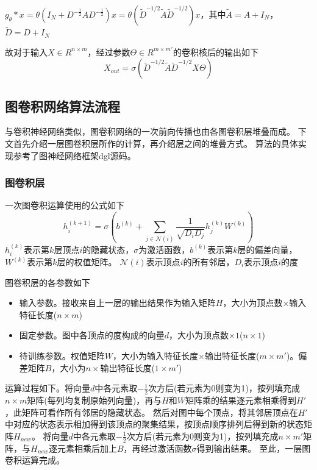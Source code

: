 $g_\theta*x=\theta(I_N+D^{-\frac{1}{2}}AD^{-\frac{1}{2}})x=\theta(\tilde{D}^{-1 / 2} \tilde{A} \tilde{D}^{-1 / 2})x$，其中$\tilde{A}=A+I_N$，$\tilde{D}=D+I_N$

\begin{definition}
    故对于输入$X\in R^{n\times m}$，经过参数$\Theta\in R^{m\times m'}$的卷积核后的输出如下
    \begin{equation}
        X_{out}=\sigma\left(\tilde{D}^{-1 / 2} \tilde{A} \tilde{D}^{-1 / 2} X \Theta\right)
    \end{equation}
\end{definition}

\subsection{图卷积网络算法流程}
与卷积神经网络类似，图卷积网络的一次前向传播也由各图卷积层堆叠而成。
下文首先介绍一层图卷积层所作的计算，再介绍层之间的堆叠方式。
算法的具体实现参考了图神经网络框架dgl源码。

\subsubsection{图卷积层}

\begin{definition}
    一次图卷积运算使用的公式如下
    \begin{equation}
        h_i^{(k+1)} = \sigma(b^{(k)} + \sum_{j\in\mathcal{N}(i)}\frac{1}{\sqrt{D_iD_j}} h_j^{(k)}W^{(k)})
    \end{equation}
    $h_i^{(k)}$表示第$k$层顶点$i$的隐藏状态，$\sigma$为激活函数，$b^{(k)}$表示第$k$层的偏差向量，$W^{(k)}$表示第$k$层的权值矩阵。
    $\mathcal{N}(i)$表示顶点$i$的所有邻居，$D_i$表示顶点$i$的度
\end{definition}

图卷积层的各参数如下
\begin{itemize}
    \item 输入参数。接收来自上一层的输出结果作为输入矩阵$H$，大小为顶点数$\times $输入特征长度($n\times m$)
    \item 固定参数。图中各顶点的度构成的向量$d$，大小为顶点数$\times 1$($n\times 1$)
    \item 待训练参数。权值矩阵$W$，大小为输入特征长度$\times$输出特征长度($m\times m'$)。偏差矩阵$B$，大小为$n\times$输出特征长度($1\times m'$)
\end{itemize}

运算过程如下。将向量$d$中各元素取$-\frac{1}{2}$次方后(若元素为0则变为1)，按列填充成$n\times m$矩阵(每列均复制原始列向量)，再与$H$和$W$矩阵乘的结果逐元素相乘得到$H'$，此矩阵可看作所有邻居的隐藏状态。
然后对图中每个顶点，将其邻居顶点在$H'$中对应的状态表示相加得到该顶点的聚集结果，按顶点顺序排列后得到新的状态矩阵$H_{new}$。
将向量$d$中各元素取$-\frac{1}{2}$次方后(若元素为0则变为1)，按列填充成$n\times m'$矩阵，与$H_{new}$逐元素相乘后加上$B$，再经过激活函数$\sigma$得到输出结果。
至此，一层图卷积运算完成。

